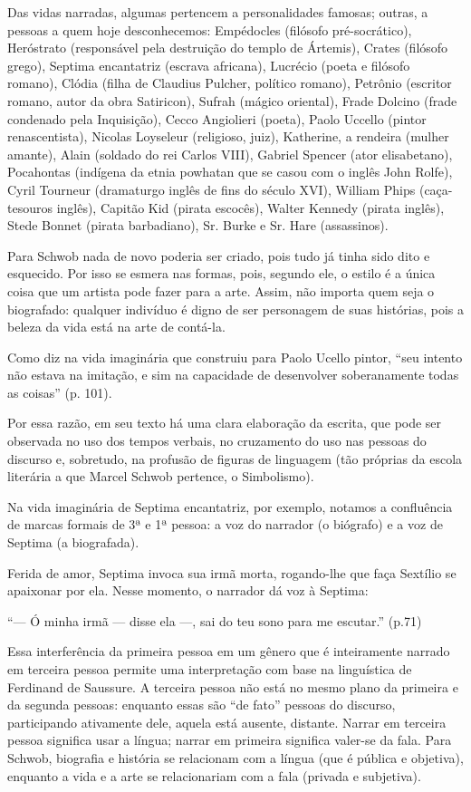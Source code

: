 \documentclass[12pt]{extarticle}
\begin{document}
Das vidas narradas, algumas pertencem a personalidades famosas; outras,
a pessoas a quem hoje desconhecemos: Empédocles (filósofo
pré-socrático), Heróstrato (responsável pela destruição do templo de
Ártemis), Crates (filósofo grego), Septima encantatriz (escrava
africana), Lucrécio (poeta e filósofo romano), Clódia (filha de Claudius
Pulcher, político romano), Petrônio (escritor romano, autor da obra
Satiricon), Sufrah (mágico oriental), Frade Dolcino (frade condenado
pela Inquisição), Cecco Angiolieri (poeta), Paolo Uccello (pintor
renascentista), Nicolas Loyseleur (religioso, juiz), Katherine, a
rendeira (mulher amante), Alain (soldado do rei Carlos VIII), Gabriel
Spencer (ator elisabetano), Pocahontas (indígena da etnia powhatan que
se casou com o inglês John Rolfe), Cyril Tourneur (dramaturgo inglês de
fins do século XVI), William Phips (caça-tesouros inglês), Capitão Kid
(pirata escocês), Walter Kennedy (pirata inglês), Stede Bonnet (pirata
barbadiano), Sr. Burke e Sr. Hare (assassinos).

Para Schwob nada de novo poderia ser criado, pois tudo já tinha sido
dito e esquecido. Por isso se esmera nas formas, pois, segundo ele, o
estilo é a única coisa que um artista pode fazer para a arte. Assim, não
importa quem seja o biografado: qualquer indivíduo é digno de ser
personagem de suas histórias, pois a beleza da vida está na arte de
contá-la.

Como diz na vida imaginária que construiu para Paolo Ucello pintor,
``seu intento não estava na imitação, e sim na capacidade de desenvolver
soberanamente todas as coisas'' (p. 101).

Por essa razão, em seu texto há uma clara elaboração da escrita, que
pode ser observada no uso dos tempos verbais, no cruzamento do uso nas
pessoas do discurso e, sobretudo, na profusão de figuras de linguagem
(tão próprias da escola literária a que Marcel Schwob pertence, o
Simbolismo).

Na vida imaginária de Septima encantatriz, por exemplo, notamos a
confluência de marcas formais de 3ª e 1ª pessoa: a voz do narrador (o
biógrafo) e a voz de Septima (a biografada).

Ferida de amor, Septima invoca sua irmã morta, rogando-lhe que faça
Sextílio se apaixonar por ela. Nesse momento, o narrador dá voz à
Septima:

``--- Ó minha irmã --- disse ela ---, sai do teu sono para me escutar.''
(p.71)

Essa interferência da primeira pessoa em um gênero que é inteiramente
narrado em terceira pessoa permite uma interpretação com base na
linguística de Ferdinand de Saussure. A terceira pessoa não está no
mesmo plano da primeira e da segunda pessoas: enquanto essas são ``de
fato'' pessoas do discurso, participando ativamente dele, aquela está
ausente, distante. Narrar em terceira pessoa significa usar a língua;
narrar em primeira significa valer-se da fala. Para Schwob, biografia e
história se relacionam com a língua (que é pública e objetiva), enquanto
a vida e a arte se relacionariam com a fala (privada e subjetiva).
\end{document}
